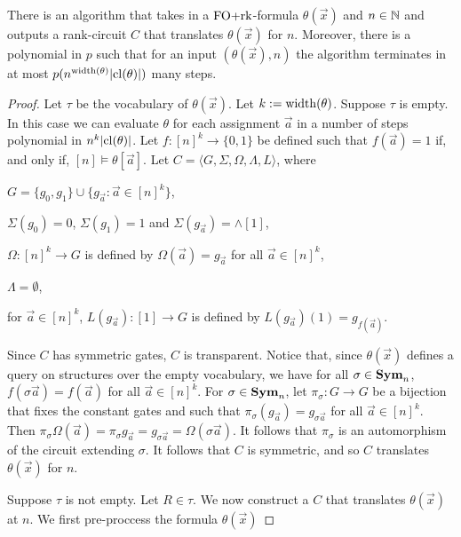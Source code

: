 \documentclass[../paper.tex]{subfiles}
\begin{document}
\begin{lem}
  There is an algorithm that takes in a $\text{\upshape FO+rk}$-formula $\theta(\vec{x})$ and $n
  \in \mathbb{N}$ and outputs a rank-circuit $C$ that translates $\theta(\vec{x})$
  for $n$. Moreover, there is a polynomial in $p$ such that for an input
  $(\theta(\vec{x}), n)$ the algorithm terminates in at most
  $p(n^{\mathrm{width}(\theta)}\vert \mathrm{cl}(\theta) \vert)$ many steps.
\end{lem}
\begin{proof}
  Let $\tau$ be the vocabulary of $\theta(\vec{x})$. Let $k := \mathrm{width}(\theta)$.
  Suppose $\tau$ is empty. In this case we can evaluate $\theta$ for each
  assignment $\vec{a}$ in a number of steps polynomial in $n^k \vert \mathrm{cl}(\theta)
  \vert$. Let $f : [n]^k \rightarrow \{0,1\}$ be defined such that $f (\vec{a})
  = 1$ if, and only if, $[n] \models \theta[\vec{a}]$. Let $C = \langle G,
  \Sigma, \Omega, \Lambda, L \rangle$, where
  \begin{itemizens}
  \item $G = \{g_0, g_1\} \cup \{g_{\vec{a}} : \vec{a} \in [n]^{k}\}$,
  \item $\Sigma (g_0) = 0$, $\Sigma (g_1) = 1$ and $\Sigma (g_{\vec{a}}) =
    \land[1]$,
  \item $\Omega : [n]^k \rightarrow G$ is defined by $\Omega(\vec{a}) =
    g_{\vec{a}}$ for all $\vec{a} \in [n]^k$,
  \item $\Lambda = \emptyset$,
  \item for $\vec{a} \in [n]^k$, $L(g_{\vec{a}}) : [1] \rightarrow G$ is defined
    by $L(g_{\vec{a}})(1) = g_{f(\vec{a})}$.
  \end{itemizens}
  
  Since $C$ has symmetric gates, $C$ is transparent. Notice that, since
  $\theta(\vec{x})$ defines a query on structures over the empty vocabulary, we
  have for all $\sigma \in \text{\textbf{Sym}}_n$, $f(\sigma \vec{a}) = f(\vec{a})$ for all
  $\vec{a} \in [n]^k$. For $\sigma \in \text{\textbf{Sym}}_n$, let $\pi_\sigma : G \rightarrow
  G$ be a bijection that fixes the constant gates and such that $\pi_{\sigma}
  (g_{\vec{a}}) = g_{\sigma \vec{a}}$ for all $\vec{a} \in [n]^k$. Then
  $\pi_\sigma \Omega (\vec{a}) = \pi_\sigma g_{\vec{a}} = g_{\sigma \vec{a}} =
  \Omega (\sigma \vec{a})$. It follows that $\pi_\sigma$ is an automorphism of
  the circuit extending $\sigma$. It follows that $C$ is symmetric, and so $C$
  translates $\theta(\vec{x})$ for $n$.

  Suppose $\tau$ is not empty. Let $R \in \tau$. We now construct a $C$ that
  translates $\theta(\vec{x})$ at $n$. We first pre-proccess the formula $\theta(\vec{x})$


\end{proof}
\end{document}
